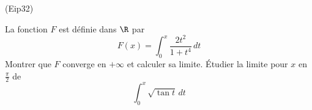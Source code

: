 \begin{tiny}(Eip32)\end{tiny} La fonction $F$ est définie dans $\R$ par
\begin{displaymath}
  F(x) = \int_0^x \frac{2t^2}{1+t^4}\,dt
\end{displaymath}
Montrer que $F$ converge en $+\infty$ et calculer sa limite. \newline
\'Etudier la limite pour $x$ en $\frac{\pi}{2}$ de
\begin{displaymath}
  \int_0^x \sqrt{\tan t}\, dt
\end{displaymath}
